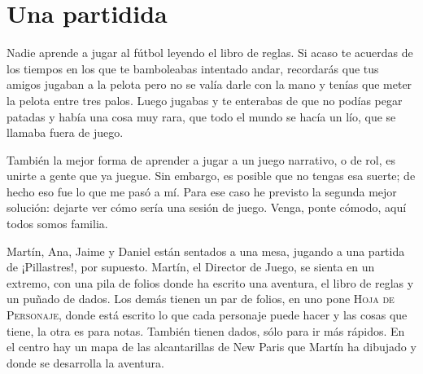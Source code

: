 \section{Una partidida}

Nadie aprende a jugar al fútbol leyendo el libro de reglas. Si acaso te acuerdas de los tiempos en los que te bamboleabas intentado andar, recordarás que tus amigos jugaban a la pelota pero no se valía darle con la mano y tenías que meter la pelota entre tres palos. Luego jugabas y te enterabas de que no podías pegar patadas y había una cosa muy rara, que todo el mundo se hacía un lío, que se llamaba fuera de juego.

También la mejor forma de aprender a jugar a un juego narrativo, o de rol, es unirte a gente que ya juegue. Sin embargo, es posible que no tengas esa suerte; de hecho eso fue lo que me pasó a mí. Para ese caso he previsto la segunda mejor solución: dejarte ver cómo sería una sesión de juego. Venga, ponte cómodo, aquí todos somos familia.

Martín, Ana, Jaime y Daniel están sentados a una mesa, jugando a una partida de ¡Pillastres!, por supuesto. Martín, el Director de Juego, se sienta en un extremo, con una pila de folios donde ha escrito una aventura, el libro de reglas y un puñado de dados. Los demás tienen un par de folios, en uno pone \textsc{Hoja de Personaje}, donde está escrito lo que cada personaje puede hacer y las cosas que tiene, la otra es para notas. También tienen dados, sólo para ir más rápidos. En el centro hay un mapa de las alcantarillas de New Paris que Martín ha dibujado y donde se desarrolla la aventura.

